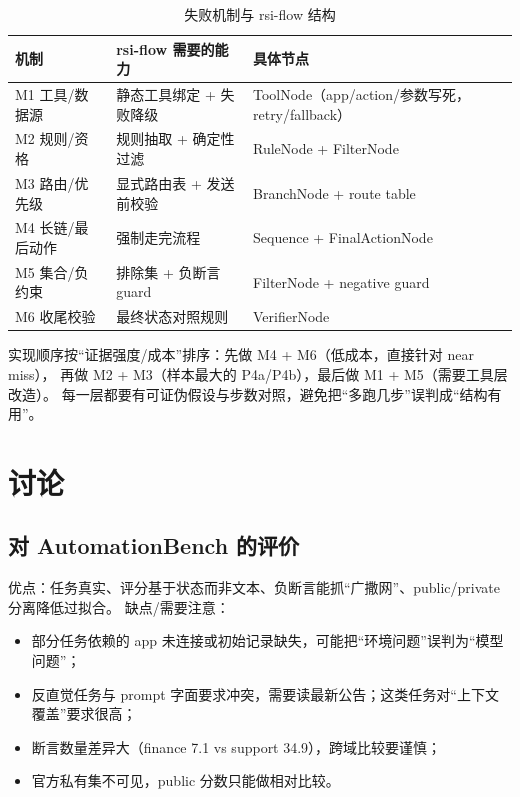 \documentclass[UTF8,a4paper,11pt]{ctexart}
\begin{document}
\begin{table}[htbp]
\centering
\caption{失败机制与 rsi-flow 结构}
\begin{tabularx}{\textwidth}{p{3.2cm}p{5.0cm}X}
\toprule
机制 & rsi-flow 需要的能力 & 具体节点 \\
\midrule
M1 工具/数据源 & 静态工具绑定 + 失败降级 & ToolNode（app/action/参数写死，retry/fallback） \\
M2 规则/资格 & 规则抽取 + 确定性过滤 & RuleNode + FilterNode \\
M3 路由/优先级 & 显式路由表 + 发送前校验 & BranchNode + route table \\
M4 长链/最后动作 & 强制走完流程 & Sequence + FinalActionNode \\
M5 集合/负约束 & 排除集 + 负断言 guard & FilterNode + negative guard \\
M6 收尾校验 & 最终状态对照规则 & VerifierNode \\
\bottomrule
\end{tabularx}
\end{table}

实现顺序按“证据强度/成本”排序：先做 M4 + M6（低成本，直接针对 near miss），
再做 M2 + M3（样本最大的 P4a/P4b），最后做 M1 + M5（需要工具层改造）。
每一层都要有可证伪假设与步数对照，避免把“多跑几步”误判成“结构有用”。

\section{讨论}
\label{sec:discussion}

\subsection{对 AutomationBench 的评价}

优点：任务真实、评分基于状态而非文本、负断言能抓“广撒网”、public/private 分离降低过拟合。
缺点/需要注意：

\begin{itemize}
  \item 部分任务依赖的 app 未连接或初始记录缺失，可能把“环境问题”误判为“模型问题”；
  \item 反直觉任务与 prompt 字面要求冲突，需要读最新公告；这类任务对“上下文覆盖”要求很高；
  \item 断言数量差异大（finance 7.1 vs support 34.9），跨域比较要谨慎；
  \item 官方私有集不可见，public 分数只能做相对比较。
\end{itemize}
\end{document}
